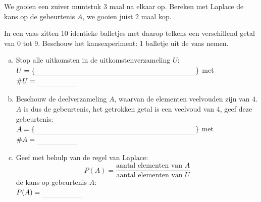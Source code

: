 \documentclass[12pt,twoside]{article}
\begin{document}
\begin{oefening}
We gooien een zuiver muntstuk 3 maal na elkaar op. Bereken met Laplace de kans op de gebeurtenis $A$, we gooien juist 2 maal kop.
\end{oefening}

\begin{oefening}
In een vaas zitten 10 identieke balletjes met daarop telkens een verschillend getal van 0 tot 9. Beschouw het kansexperiment: 1 balletje uit de vaas nemen.
\begin{enumerate}[(a)]
  \item Stop alle uitkomsten in de uitkomstenverzameling $U$:\\
  $U=\{\arule{8cm}\}$ met $\#U=\arule{2cm}$
  \item Beschouw de deelverzameling $A$, waarvan de elementen veelvouden zijn van $4$. $A$ is dus de gebeurtenis, het getrokken getal is een veelvoud van $4$, geef deze gebeurtenis:\\
  $A=\{\arule{8cm}\}$ met $\#A=\arule{2cm}$
  \item Geef met behulp van de regel van Laplace:
  $$P(A)=\dfrac{\mbox{aantal elementen van }A}{\mbox{aantal elementen van }U}$$
  de kans op gebeurtenis $A$:\\
  $P(A)=\arule{2cm}$
\end{enumerate}
\end{oefening}
\vspace*{0.5cm}
\end{document}
